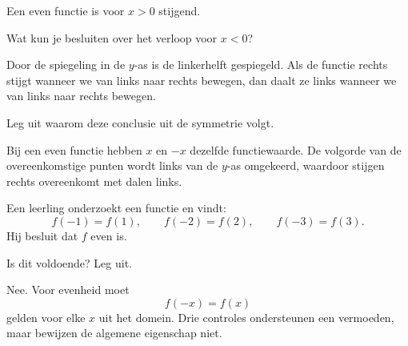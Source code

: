 \documentclass{ximera}
\begin{document}
\begin{oefening}{\oefU\ESS}

Een even functie is voor \(x>0\) stijgend.

\begin{question}
Wat kun je besluiten over het verloop voor \(x<0\)?
\begin{oplossing}
Door de spiegeling in de \(y\)-as is de linkerhelft gespiegeld.
Als de functie rechts stijgt wanneer we van links naar rechts bewegen,
dan daalt ze links wanneer we van links naar rechts bewegen.
\end{oplossing}
\end{question}

\begin{question}
Leg uit waarom deze conclusie uit de symmetrie volgt.
\begin{oplossing}
Bij een even functie hebben \(x\) en \(-x\) dezelfde functiewaarde.
De volgorde van de overeenkomstige punten wordt links van de \(y\)-as omgekeerd,
waardoor stijgen rechts overeenkomt met dalen links.
\end{oplossing}
\end{question}

\end{oefening}

\begin{oefening}{\oefU\ESS}

Een leerling onderzoekt een functie en vindt:
\[
f(-1)=f(1),\qquad f(-2)=f(2),\qquad f(-3)=f(3).
\]
Hij besluit dat \(f\) even is.

Is dit voldoende? Leg uit.

\begin{oplossing}
Nee. Voor evenheid moet
\[
f(-x)=f(x)
\]
gelden voor elke \(x\) uit het domein. Drie controles ondersteunen een vermoeden,
maar bewijzen de algemene eigenschap niet.
\end{oplossing}

\end{oefening}
\end{document}
